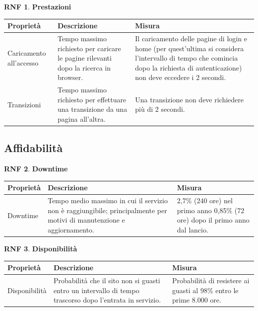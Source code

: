 \documentclass[11pt, a4paper]{article}
\theoremstyle{definition} %
\newtheorem{nonfuncreq}{RNF} %
\begin{document}
\begin{nonfuncreq}
    \textbf{Prestazioni }
    \begin{center}
        \footnotesize
        \begin{tabularx}{\textwidth}{|X||X||X|}
            \hline
            \cellcolor{red!70}Proprietà & \cellcolor{red!70}Descrizione & \cellcolor{red!70}Misura\\
            \hline
            Caricamento all'accesso & Tempo massimo richiesto per caricare le pagine rilevanti dopo la ricerca in browser. & Il caricamento delle pagine di login e home (per quest'ultima si considera l'intervallo di tempo che comincia dopo la richiesta di autenticazione) non deve eccedere i 2 secondi.\\
            \hline
            Transizioni & Tempo massimo richiesto per effettuare una transizione da una pagina all'altra.  & Una transizione non deve richiedere più di 2 secondi.\\
            \hline
        \end{tabularx}
    \end{center}
\end{nonfuncreq}

\subsection{Affidabilità}

\begin{nonfuncreq}
    \textbf{Downtime }
    \begin{center}
        \footnotesize
        \begin{tabularx}{\textwidth}{|X||X||X|}
            \hline
            \cellcolor{red!70}Proprietà & \cellcolor{red!70}Descrizione & \cellcolor{red!70}Misura\\
            \hline
            Downtime & Tempo medio massimo in cui il servizio non è raggiungibile; principalmente per motivi di manutenzione e aggiornamento. & 2,7\% (240 ore) nel primo anno 0,85\% (72 ore) dopo il primo anno dal lancio.\\
            \hline
        \end{tabularx}
    \end{center}
\end{nonfuncreq}

\begin{nonfuncreq}
    \textbf{Disponibilità }
    \begin{center}
        \footnotesize
        \begin{tabularx}{\textwidth}{|X||X||X|}
            \hline
            \cellcolor{red!70}Proprietà & \cellcolor{red!70}Descrizione & \cellcolor{red!70}Misura\\
            \hline
            Disponibilità & Probabilità che il sito non si guasti entro un intervallo di tempo trascorso dopo l'entrata in servizio. & Probabilità di resistere ai guasti al 98\% entro le prime 8.000 ore.\\
            \hline
        \end{tabularx}
    \end{center}
\end{nonfuncreq}
\end{document}
